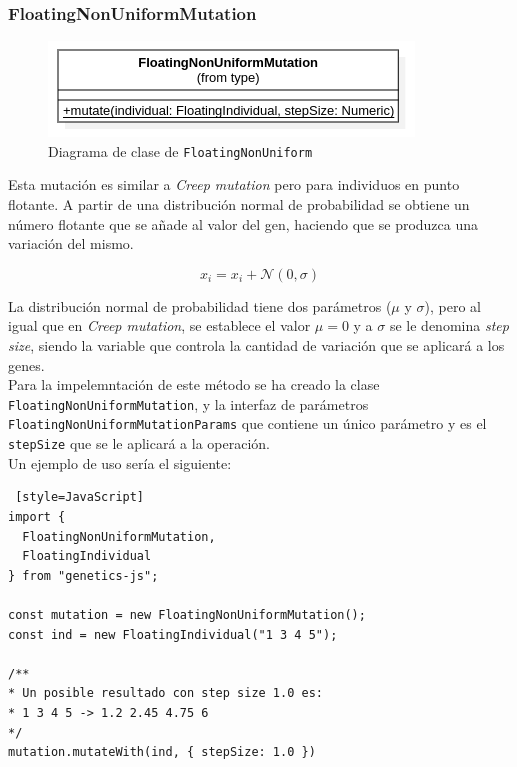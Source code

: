\subsubsection{FloatingNonUniformMutation}

\begin{figure}[ht]
    \centering
    \includegraphics[scale=0.6]{mem/images/cap-4/4.2.7(Mutation)/FloatingNonUniformMutation.png}
    \caption{Diagrama de clase de \texttt{FloatingNonUniform}}
    \label{fig:my_label}
\end{figure}

Esta mutación es similar a \textit{Creep mutation} pero para individuos en punto flotante. A partir de una distribución normal de probabilidad se obtiene un número flotante que se añade al valor del gen, haciendo que se produzca una variación del mismo.

\begin{equation}
    x_i = x_i + \mathcal{N}(0, \sigma)
\end{equation}

La distribución normal de probabilidad tiene dos parámetros ($\mu$ y $\sigma$), pero al igual que en \textit{Creep mutation}, se establece el valor $\mu = 0$ y a $\sigma$ se le denomina \textit{step size}, siendo la variable que controla la cantidad de variación que se aplicará a los genes. \\

Para la impelemntación de este método se ha creado la clase \texttt{FloatingNonUniformMutation}, y la interfaz de parámetros \texttt{FloatingNonUniformMutationParams} que contiene un único parámetro y es el \texttt{stepSize} que se le aplicará a la operación.\\

Un ejemplo de uso sería el siguiente: \\

\begin{lstlisting} [style=JavaScript]
import { 
  FloatingNonUniformMutation,
  FloatingIndividual 
} from "genetics-js";

const mutation = new FloatingNonUniformMutation();
const ind = new FloatingIndividual("1 3 4 5");

/**
* Un posible resultado con step size 1.0 es:
* 1 3 4 5 -> 1.2 2.45 4.75 6
*/
mutation.mutateWith(ind, { stepSize: 1.0 })
\end{lstlisting}

